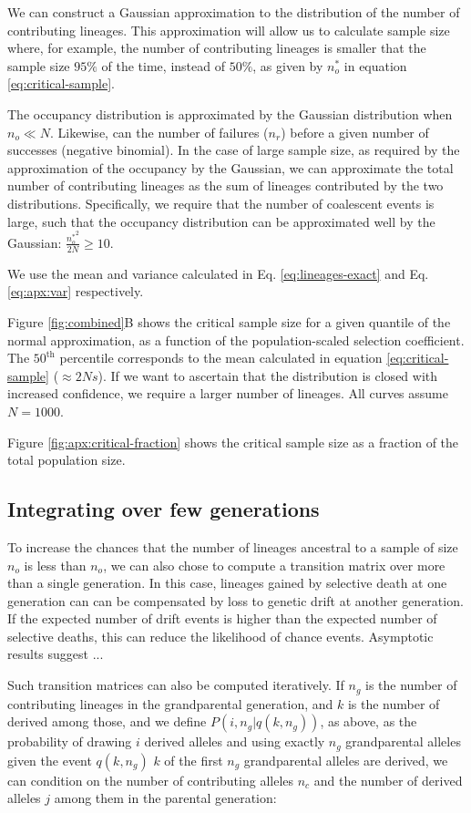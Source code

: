 \documentclass[review]{elsarticle}
\begin{document}
We can construct a Gaussian approximation to the distribution of the number of contributing lineages.
This approximation will allow us to calculate sample size where, for example, the number of
contributing lineages is smaller that the sample size $95\%$ of the time, instead of $50\%$, as
given by $n_o^*$ in equation \eqref{eq:critical-sample}.

The occupancy distribution is approximated by the Gaussian distribution \citep{ONeill2019} when
$n_o \ll N$. Likewise, can the number of failures ($n_r$) before a given number of successes
(negative binomial). In the case of large sample size, as required by the approximation of the
occupancy by the Gaussian, we can approximate the total number of contributing lineages as the sum
of lineages contributed by the two distributions. Specifically, we require that the number of
coalescent events is large, such that the occupancy distribution can be approximated well by the
Gaussian: $\frac{{n_o^*}^2}{2N} \ge 10$.

We use the mean and variance calculated in Eq. \ref{eq:lineages-exact} and Eq. \ref{eq:apx:var}
respectively.

Figure \ref{fig:combined}B shows the critical sample size for a given quantile of the normal
approximation, as a function of the population-scaled selection coefficient. The $50^{\text{th}}$
percentile corresponds to the mean calculated in equation \ref{eq:critical-sample} ($\approx 2Ns$).
If we want to ascertain that the distribution is closed with increased confidence, we require a
larger number of lineages. All curves assume $N=1000$.

Figure \ref{fig:apx:critical-fraction} shows the critical sample size as a fraction of the total
population size.

\subsection
{Integrating over few generations} 
To increase the chances that the number of lineages ancestral to a sample 
of size $n_o$ is less than $n_o$, we can also chose to compute a transition matrix over more 
than a single generation. In this case, lineages gained by selective death at one generation can 
can be compensated by loss to genetic drift at another generation. If the expected number of 
drift events is higher than the expected number of selective deaths, this can reduce the likelihood 
of chance events. Asymptotic results suggest ... 

Such transition matrices can also be computed iteratively. If $n_g$ is the number of contributing
lineages in the grandparental generation, and $k$ is the number of derived among those, and we
define $P(i, n_g | q(k, n_g))$, as above, as the probability of drawing $i$ derived alleles and
using exactly $n_g$ grandparental alleles given the event $q(k, n_g)$ $k$ of the first $n_g$
grandparental alleles are derived, we can condition on the number of contributing alleles $n_c$ and
the number of derived alleles $j$ among them in the parental generation:
 
\end{document}
